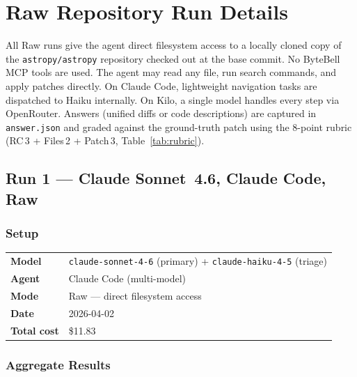 
\section{Raw Repository Run Details}
\label{sec:raw}

\noindent
All Raw runs give the agent direct filesystem access to a locally cloned
copy of the \texttt{astropy/astropy} repository checked out at the base commit.
No ByteBell MCP tools are used.
The agent may read any file, run search commands, and apply patches directly.
On Claude Code, lightweight navigation tasks are dispatched to Haiku internally.
On Kilo, a single model handles every step via OpenRouter.
Answers (unified diffs or code descriptions) are captured in \texttt{answer.json}
and graded against the ground-truth patch using the 8-point rubric
(RC\,3 + Files\,2 + Patch\,3, Table~\ref{tab:rubric}).

\subsection{Run 1 --- Claude Sonnet~4.6, Claude Code, Raw}
\label{sec:run1}

\subsubsection{Setup}

\begin{tabular}{ll}
\textbf{Model}     & \texttt{claude-sonnet-4-6} (primary) + \texttt{claude-haiku-4-5} (triage) \\
\textbf{Agent}     & Claude Code (multi-model) \\
\textbf{Mode}      & Raw --- direct filesystem access \\
\textbf{Date}      & 2026-04-02 \\
\textbf{Total cost} & \$11.83 \\
\end{tabular}

\subsubsection{Aggregate Results}

